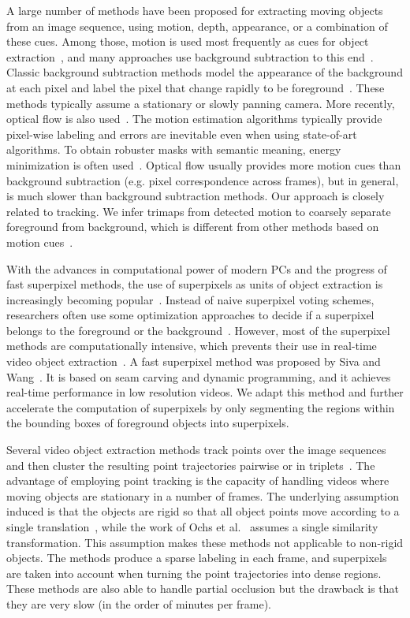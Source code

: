 A large number of methods have been proposed for extracting moving objects from an image sequence, using motion, depth, appearance, or a combination of these cues.
Among those, motion is used most frequently as cues for object extraction~\cite{graciela2013}, and many approaches use
background subtraction to this end~\cite{zeng2007,colombari2007}.
Classic background subtraction methods model the appearance of the background at each pixel and label the pixel that change rapidly to be foreground~\cite{jain1979,kaewtrakulpong2002,zivkovic2004}. These methods typically assume a stationary or slowly panning camera.
More recently, optical flow is also used~\cite{ma2012,papazoglou2013,zhang2013,wang2015}.
The motion estimation algorithms typically provide pixel-wise labeling and errors are inevitable even when using state-of-art algorithms.
To obtain robuster masks with semantic meaning, energy minimization is often used~\cite{papazoglou2013}.
Optical flow usually provides more motion cues than background subtraction (e.g. pixel correspondence across frames), but in general, is much slower than background subtraction methods.
Our approach is closely related to tracking. We infer trimaps from detected motion to coarsely separate foreground from background, which is different from other methods based on motion cues~\cite{papazoglou2013,wang2015}.

With the advances in computational power of modern PCs and the progress of fast superpixel methods, the use of superpixels as units of object extraction is increasingly becoming popular~\cite{papazoglou2013,wang2015,ochs2011}. Instead of naive superpixel voting schemes, researchers often use some optimization approaches to decide if a superpixel belongs to the foreground or the background~\cite{papazoglou2013,wang2015,ochs2011}. However, most of the superpixel methods are computationally intensive, which prevents their use in real-time video object extraction~\cite{achanta2012}. A fast superpixel method was proposed by Siva and Wang~\cite{siva2014}. It is based on seam carving and dynamic programming, and it achieves real-time performance in low resolution videos. We adapt this method and further accelerate the computation of superpixels by only segmenting the regions within the bounding boxes of foreground objects into superpixels.

Several video object extraction methods track points over the image sequences and then cluster the resulting point trajectories pairwise or in triplets~\cite{brox2010,ochs2011,ochs2012}.
The advantage of employing point tracking is the capacity of handling videos where moving objects are stationary in a number of frames.
The underlying assumption induced is that the objects are rigid so that all object points move according to a single translation~\cite{brox2010,ochs2011}, while the work of Ochs et al.~\cite{ochs2012} assumes a single similarity transformation. This assumption makes these methods not applicable to non-rigid objects.
The methods produce a sparse labeling in each frame, and superpixels are taken into account when turning the point trajectories into dense regions.
These methods are also able to handle partial occlusion but the drawback is that they are very slow (in the order of minutes per frame).

